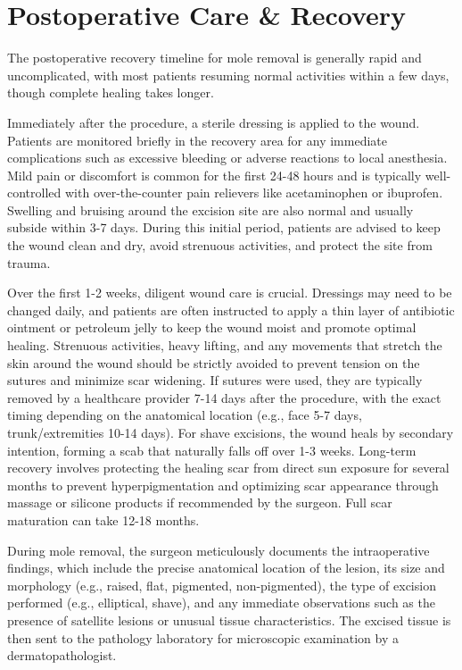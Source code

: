 \section*{Postoperative Care \& Recovery}
The postoperative recovery timeline for mole removal is generally rapid and uncomplicated, with most patients resuming normal activities within a few days, though complete healing takes longer. 

Immediately after the procedure, a sterile dressing is applied to the wound. Patients are monitored briefly in the recovery area for any immediate complications such as excessive bleeding or adverse reactions to local anesthesia. Mild pain or discomfort is common for the first 24-48 hours and is typically well-controlled with over-the-counter pain relievers like acetaminophen or ibuprofen. Swelling and bruising around the excision site are also normal and usually subside within 3-7 days. During this initial period, patients are advised to keep the wound clean and dry, avoid strenuous activities, and protect the site from trauma.

Over the first 1-2 weeks, diligent wound care is crucial. Dressings may need to be changed daily, and patients are often instructed to apply a thin layer of antibiotic ointment or petroleum jelly to keep the wound moist and promote optimal healing. Strenuous activities, heavy lifting, and any movements that stretch the skin around the wound should be strictly avoided to prevent tension on the sutures and minimize scar widening. If sutures were used, they are typically removed by a healthcare provider 7-14 days after the procedure, with the exact timing depending on the anatomical location (e.g., face 5-7 days, trunk/extremities 10-14 days). For shave excisions, the wound heals by secondary intention, forming a scab that naturally falls off over 1-3 weeks. Long-term recovery involves protecting the healing scar from direct sun exposure for several months to prevent hyperpigmentation and optimizing scar appearance through massage or silicone products if recommended by the surgeon. Full scar maturation can take 12-18 months.

During mole removal, the surgeon meticulously documents the intraoperative findings, which include the precise anatomical location of the lesion, its size and morphology (e.g., raised, flat, pigmented, non-pigmented), the type of excision performed (e.g., elliptical, shave), and any immediate observations such as the presence of satellite lesions or unusual tissue characteristics. The excised tissue is then sent to the pathology laboratory for microscopic examination by a dermatopathologist.

